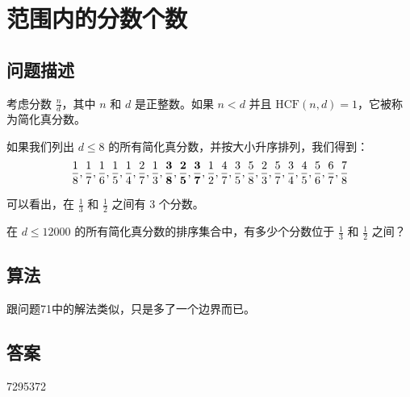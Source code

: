 \section{范围内的分数个数}\label{sec:problem73}
\subsection{问题描述}
\begin{tcolorbox}
	考虑分数 \( \frac{n}{d} \)，其中 \( n \) 和 \( d \) 是正整数。如果 \( n < d \) 并且 \( \text{HCF}(n, d) = 1 \)，它被称为简化真分数。

	如果我们列出 \( d \leq 8 \) 的所有简化真分数，并按大小升序排列，我们得到：
	\[ \frac{1}{8}, \frac{1}{7}, \frac{1}{6}, \frac{1}{5}, \frac{1}{4}, \frac{2}{7}, \frac{1}{3}, \frac{\bf 3}{\bf 8},
		\frac{\bf 2}{\bf 5}, \frac{\bf 3}{\bf 7}, \frac{1}{2}, \frac{4}{7}, \frac{3}{5}, \frac{5}{8}, \frac{2}{3}, \frac{5}{7}, \frac{3}{4}, \frac{4}{5}, \frac{5}{6}, \frac{6}{7}, \frac{7}{8} \]

	可以看出，在 \( \frac{1}{3} \) 和 \( \frac{1}{2} \) 之间有 3 个分数。

	在 \( d \leq 12000 \) 的所有简化真分数的排序集合中，有多少个分数位于 \( \frac{1}{3} \) 和 \( \frac{1}{2} \) 之间？
\end{tcolorbox}

\subsection{算法}
跟问题71中的解法类似，只是多了一个边界而已。

\subsection{答案}
7295372
